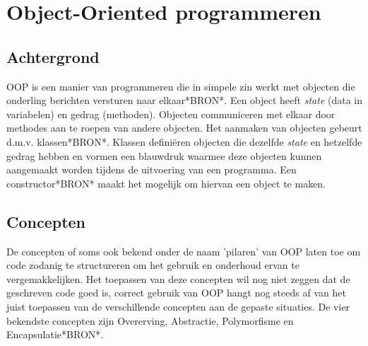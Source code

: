\section{Object-Oriented programmeren}
\subsection{Achtergrond}
OOP is een manier van programmeren die in simpele zin werkt met objecten die onderling berichten versturen naar elkaar*BRON*. Een object heeft \textit{state} (data in variabelen) en gedrag (methoden). Objecten communiceren met elkaar door methodes aan te roepen van andere objecten. Het aanmaken van objecten gebeurt d.m.v. klassen*BRON*. Klassen definiëren objecten die dezelfde \textit{state} en hetzelfde gedrag hebben en vormen een blauwdruk waarmee deze objecten kunnen aangemaakt worden tijdens de uitvoering van een programma. Een constructor*BRON* maakt het mogelijk om hiervan een object te maken.

\subsection{Concepten}
De concepten of soms ook bekend onder de naam 'pilaren' van OOP laten toe om code zodanig te structureren om het gebruik en onderhoud ervan te vergemakkelijken. Het toepassen van deze concepten wil nog niet zeggen dat de geschreven code goed is, correct gebruik van OOP hangt nog steeds af van het juist toepassen van de verschillende concepten aan de gepaste situaties. De vier bekendste concepten zijn Overerving, Abstractie, Polymorfisme en Encapsulatie*BRON*.

